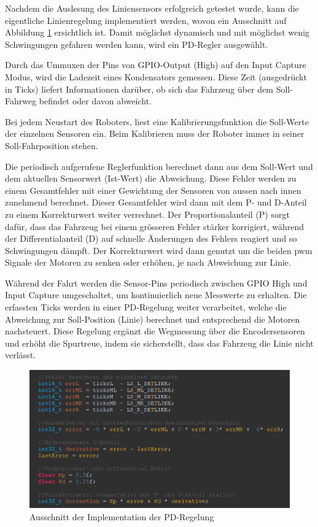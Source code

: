 Nachdem die Auslesung des Liniensensors erfolgreich getestet wurde, kann die eigentliche Linienregelung implementiert werden, wovon ein Ausschnitt auf Abbildung \ref{fig:Ausschnitt der Implementation der PD-Regelung} ersichtlich ist. Damit möglichst dynamisch und mit möglichst wenig Schwingungen gefahren werden kann, wird ein PD-Regler ausgewählt.

Durch das Ummuxen der Pins von GPIO-Output (High) auf den Input Capture Modus, wird die Ladezeit eines Kondensators gemessen. Diese Zeit (ausgedrückt in Ticks) liefert Informationen darüber, ob sich das Fahrzeug über dem Soll-Fahrweg befindet oder davon abweicht.

Bei jedem Neustart des Roboters, liest eine Kalibrierungsfunktion die Soll-Werte der einzelnen Sensoren ein. Beim Kalibrieren muss der Roboter immer in seiner Soll-Fahrposition stehen.

Die periodisch aufgerufene Reglerfunktion berechnet dann aus dem Soll-Wert und dem aktuellen Sensorwert (Ist-Wert) die Abweichung. Diese Fehler werden zu einem Gesamtfehler mit einer Gewichtung der Sensoren von aussen nach innen zunehmend berechnet. Dieser Gesamtfehler wird dann mit dem P- und D-Anteil zu einem Korrekturwert weiter verrechnet. Der Proportionalanteil (P) sorgt dafür, dass das Fahrzeug bei einem grösseren Fehler stärker korrigiert, während der Differentialanteil (D) auf schnelle Änderungen des Fehlers reagiert und so Schwingungen dämpft. Der Korrekturwert wird dann genutzt um die beiden \acrfull{pwm} Signale der Motoren zu senken oder erhöhen, je nach Abweichung zur Linie.

Während der Fahrt werden die Sensor-Pins periodisch zwischen GPIO High und Input Capture umgeschaltet, um kontinuierlich neue Messwerte zu erhalten. Die erfassten Ticks werden in einer PD-Regelung weiter verarbeitet, welche die Abweichung zur Soll-Position (Linie) berechnet und entsprechend die Motoren nachsteuert. Diese Regelung ergänzt die Wegmessung über die Encodersensoren und erhöht die Spurtreue, indem sie sicherstellt, dass das Fahrzeug die Linie nicht verlässt. 

 \begin{figure}[H]
\centering
\includegraphics[width= \textwidth ]{assets/ET/PD-Regler/PD-Regler_Code_Pren2.png}
\caption{Ausschnitt der Implementation der PD-Regelung}
\label{fig:Ausschnitt der Implementation der PD-Regelung}
\end{figure}


